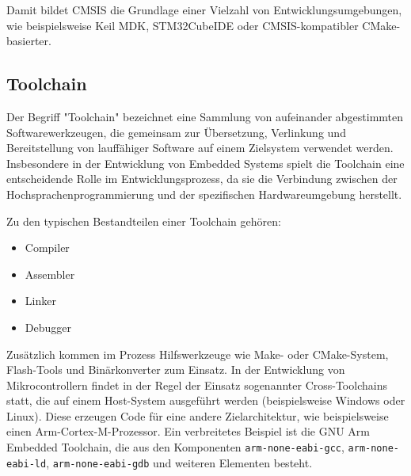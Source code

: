 Damit bildet CMSIS die Grundlage einer Vielzahl von Entwicklungsumgebungen, wie beispielsweise Keil MDK, STM32CubeIDE oder CMSIS-kompatibler CMake-basierter.


\subsection{Toolchain}
Der Begriff "Toolchain" bezeichnet eine Sammlung von aufeinander abgestimmten Softwarewerkzeugen, die gemeinsam zur Übersetzung, Verlinkung und Bereitstellung von lauffähiger Software auf einem Zielsystem verwendet werden. 
Insbesondere in der Entwicklung von Embedded Systems spielt die Toolchain eine entscheidende Rolle im Entwicklungsprozess, da sie die Verbindung zwischen der Hochsprachenprogrammierung und der spezifischen Hardwareumgebung herstellt.

Zu den typischen Bestandteilen einer Toolchain gehören:
\begin{itemize}
	\item Compiler
	\item Assembler
	\item Linker
	\item Debugger
\end{itemize}

Zusätzlich kommen im Prozess Hilfswerkzeuge wie Make- oder CMake-System, Flash-Tools und Binärkonverter zum Einsatz.
In der Entwicklung von Mikrocontrollern findet in der Regel der Einsatz sogenannter Cross-Toolchains statt, die auf einem Host-System ausgeführt werden (beispielsweise Windows oder Linux). 
Diese erzeugen Code für eine andere Zielarchitektur, wie beispielsweise einen Arm-Cortex-M-Prozessor. 
Ein verbreitetes Beispiel ist die GNU Arm Embedded Toolchain, die aus den Komponenten \texttt{arm-none-eabi-gcc}, \texttt{arm-none-eabi-ld}, \texttt{arm-none-eabi-gdb} und weiteren Elementen besteht.

%



